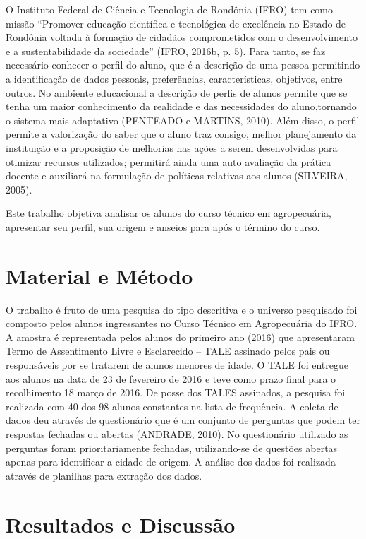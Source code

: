 \documentclass[article,12pt,onesidea,4paper,english,brazil]{abntex2}
\begin{document}
O Instituto Federal de Ciência e Tecnologia de Rondônia (IFRO) tem como missão “Promover educação científica e tecnológica de excelência no Estado de Rondônia voltada à formação de cidadãos comprometidos com o desenvolvimento e a sustentabilidade da sociedade” (IFRO, 2016b, p. 5). Para tanto, se faz necessário conhecer o perfil do aluno, que é a descrição de uma pessoa permitindo a identificação de dados pessoais, preferências, características, objetivos, entre outros. No ambiente educacional a descrição de perfis de alunos permite que se tenha um maior conhecimento da realidade e das necessidades do aluno,tornando o sistema mais adaptativo (PENTEADO e MARTINS, 2010). Além disso, o perfil permite a valorização do saber que o aluno traz consigo, melhor planejamento da instituição e a proposição de melhorias nas ações a serem desenvolvidas para otimizar recursos utilizados; permitirá ainda uma auto avaliação da prática docente e auxiliará na formulação de políticas relativas aos alunos (SILVEIRA, 2005).

Este trabalho objetiva analisar os alunos do curso técnico em agropecuária, apresentar seu perfil, sua origem e anseios para após o término do curso.


	
	\section*{Material e Método}
	
	O trabalho é fruto de uma pesquisa do tipo descritiva e o universo pesquisado foi composto pelos alunos ingressantes no Curso Técnico em Agropecuária do IFRO. A amostra é representada pelos alunos do primeiro ano (2016) que apresentaram Termo de Assentimento Livre e Esclarecido – TALE assinado pelos pais ou responsáveis por se tratarem de alunos menores de idade. O TALE foi entregue aos alunos na data de 23 de fevereiro de 2016 e teve como prazo final  para o recolhimento 18 março de 2016. De posse dos TALES assinados, a pesquisa foi realizada com 40 dos 98 alunos constantes na lista de frequência. A coleta de dados deu através de questionário que é um conjunto de perguntas que podem ter respostas fechadas ou abertas (ANDRADE, 2010). No questionário utilizado as perguntas foram prioritariamente fechadas, utilizando-se de questões abertas apenas para identificar a cidade de origem. A análise dos dados foi realizada através de planilhas para extração dos dados.
	
	\section*{Resultados e Discussão}
	
\end{document}
